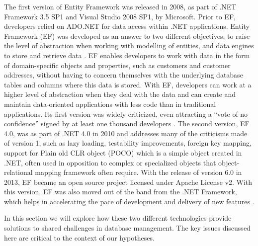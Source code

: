 The first version of Entity Framework was released in 2008, as part of .NET Framework 3.5 SP1 and Visual Studio 2008 SP1, by Microsoft. Prior to EF, developers relied on ADO.NET for data access within .NET applications. Entity Framework (EF) was developed as an answer to two different objectives, to raise the level of abstraction when working with modelling of entities, and data engines to store and retrieve data \cite{EFoverview}. EF enables developers to work with data in the form of domain-specific objects and properties, such as customers and customer addresses, without having to concern themselves with the underlying database tables and columns where this data is stored. With EF, developers can work at a higher level of abstraction when they deal with the data and can create and maintain data-oriented applications with less code than in traditional applications. Its first version was widely criticized, even attracting a “vote of no confidence” signed by at least one thousand developers \cite{adonet}. The second version, EF 4.0, was as part of .NET 4.0 in 2010 and addresses many of the criticisms made of version 1, such as lazy loading, testability improvements, foreign key mapping, support for Plain old CLR object (POCO) 
which is a simple object created in .NET, often used in opposition to complex or specialized objects that object-relational mapping framework often require.  With the release of version 6.0 in 2013, EF became an open source project licensed under Apache License v2. With this version, EF was also moved out of the band from the .NET Framework, which helps in accelerating the pace of development and delivery of new features \cite{EFevolution}. \newline

In this section we will explore how these two different technologies provide solutions to shared challenges in database management. 
The key issues discussed here are critical to the context of our hypotheses.

